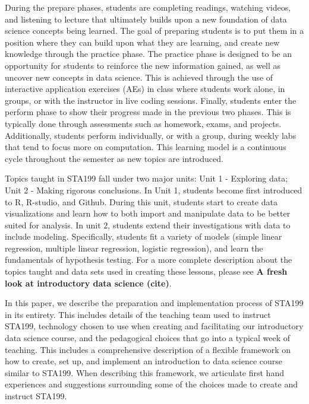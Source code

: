 \documentclass[
  12pt]{article}
\begin{document}
During the prepare phases, students are completing readings, watching
videos, and listening to lecture that ultimately builds upon a new
foundation of data science concepts being learned. The goal of preparing
students is to put them in a position where they can build upon what
they are learning, and create new knowledge through the practice phase.
The practice phase is designed to be an opportunity for students to
reinforce the new information gained, as well as uncover new concepts in
data science. This is achieved through the use of interactive
application exercises (AEs) in class where students work alone, in
groups, or with the instructor in live coding sessions. Finally,
students enter the perform phase to show their progress made in the
previous two phases. This is typically done through assessments such as
homework, exams, and projects. Additionally, students perform
individually, or with a group, during weekly labs that tend to focus
more on computation. This learning model is a continuous cycle
throughout the semester as new topics are introduced.

Topics taught in STA199 fall under two major units: Unit 1 - Exploring
data; Unit 2 - Making rigorous conclusions. In Unit 1, students become
first introduced to R, R-studio, and Github. During this unit, students
start to create data visualizations and learn how to both import and
manipulate data to be better suited for analysis. In unit 2, students
extend their investigations with data to include modeling. Specifically,
students fit a variety of models (simple linear regression, multiple
linear regression, logistic regression), and learn the fundamentals of
hypothesis testing. For a more complete description about the topics
taught and data sets used in creating these lessons, please see
\textbf{A fresh look at introductory data science (cite)}.

In this paper, we describe the preparation and implementation process of
STA199 in its entirety. This includes details of the teaching team used
to instruct STA199, technology chosen to use when creating and
facilitating our introductory data science course, and the pedagogical
choices that go into a typical week of teaching. This includes a
comprehensive description of a flexible framework on how to create, set
up, and implement an introduction to data science course similar to
STA199. When describing this framework, we articulate first hand
experiences and suggestions surrounding some of the choices made to
create and instruct STA199.
\end{document}
